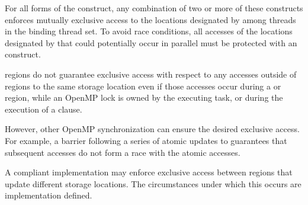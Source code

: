 %

For all forms of the  construct, any combination of two or more
of these  constructs enforces mutually exclusive access to the
locations designated by  among threads in the binding thread set.  To
avoid race conditions, all accesses of the locations designated by 
that could potentially occur in parallel must be protected with an
 construct.

 regions do not guarantee exclusive access with respect to any accesses outside
of  regions to the same storage location  even if those accesses occur during a
 or  region, while an OpenMP lock is owned by the executing
task, or during the execution of a  clause.

However, other OpenMP synchronization can ensure the desired exclusive access. For
example, a barrier following a series of atomic updates to  guarantees that subsequent
accesses do not form a race with the atomic accesses.

A compliant implementation may enforce exclusive access between  regions
that update different storage locations. The circumstances under which this occurs are
implementation defined.

